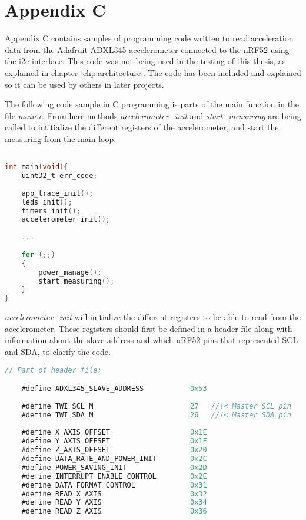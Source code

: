 \chapter{Appendix C}
\label{chp:appendixc}

Appendix C contains samples of programming code written to read acceleration data from the Adafruit ADXL345 accelerometer connected to the nRF52 using the \gls{i2c} interface. This code was not being used in the testing of this thesis, as explained in chapter \ref{chp:architecture}. The code has been included and explained so it can be used by others in later projects.

The following code sample in C programming is parts of the main function in the file \textit{main.c}. From here methods \textit{accelerometer\_init} and \textit{start\_measuring} are being called to intitialize the different registers of the accelerometer, and start the measuring from the main loop. 

\begin{lstlisting}[language=C]

int main(void){
	uint32_t err_code; 
	
	app_trace_init(); 
	leds_init(); 
	timers_init();
	accelerometer_init(); 
	
	...
	
	for (;;)
	{
		power_manage();
		start_measuring();
	}
}
\end{lstlisting}

\newpage

\textit{accelerometer\_init} will initialize the different registers to be able to read from the accelerometer. These registers should first be defined in a header file along with information about the slave address and which \gls{nRF52} pins that represented SCL and SDA, to clarify the code. 

\begin{lstlisting}[language=C]
// Part of header file: 

	#define ADXL345_SLAVE_ADDRESS			0x53
		
    #define TWI_SCL_M						27   //!< Master SCL pin
    #define TWI_SDA_M						26   //!< Master SDA pin
		
	#define X_AXIS_OFFSET					0x1E
	#define Y_AXIS_OFFSET					0x1F
	#define Z_AXIS_OFFSET					0x20
	#define DATA_RATE_AND_POWER_INIT		0x2C
	#define POWER_SAVING_INIT				0x2D
	#define INTERRUPT_ENABLE_CONTROL		0x2E
	#define DATA_FORMAT_CONTROL				0x31
	#define READ_X_AXIS						0x32
	#define READ_Y_AXIS						0x34
	#define READ_Z_AXIS						0x36
\end{lstlisting}

